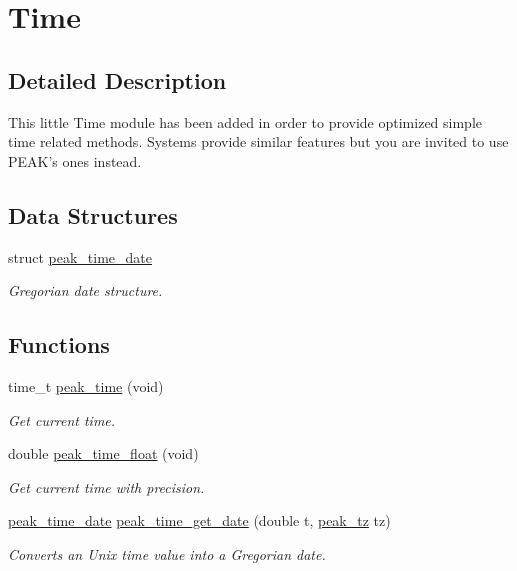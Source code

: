 \hypertarget{group__time}{
\section{Time}
\label{group__time}
}


\subsection{Detailed Description}
This little Time module has been added in order to provide optimized simple time related methods. Systems provide similar features but you are invited to use PEAK's ones instead. 

\subsection*{Data Structures}
\begin{CompactItemize}
\item 
struct \hyperlink{structpeak__time__date}{peak\_\-time\_\-date}
\begin{CompactList}\small\item\em Gregorian date structure. \item\end{CompactList}\end{CompactItemize}
\subsection*{Functions}
\begin{CompactItemize}
\item 
time\_\-t \hyperlink{group__time_ga0}{peak\_\-time} (void)
\begin{CompactList}\small\item\em Get current time. \item\end{CompactList}\item 
double \hyperlink{group__time_ga1}{peak\_\-time\_\-float} (void)
\begin{CompactList}\small\item\em Get current time with precision. \item\end{CompactList}\item 
\hyperlink{structpeak__time__date}{peak\_\-time\_\-date} \hyperlink{group__time_ga2}{peak\_\-time\_\-get\_\-date} (double t, \hyperlink{group__tz_ga0}{peak\_\-tz} tz)
\begin{CompactList}\small\item\em Converts an Unix time value into a Gregorian date. \item\end{CompactList}\end{CompactItemize}


